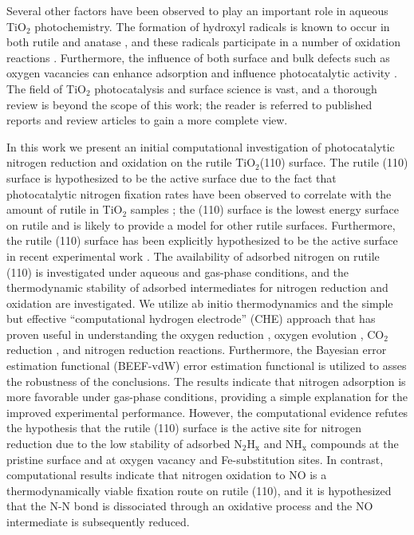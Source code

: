 \documentclass[journal=ascecg,manuscript=article,articletitle=true]{achemso}
\begin{document}
Several other factors have been observed to play an important role in aqueous TiO$_2$ photochemistry. The formation of hydroxyl radicals is known to occur in both rutile and anatase \cite{Ishibashi_2000,Xiang_2011}, and these radicals participate in a number of oxidation reactions \cite{Ishibashi_2000}. Furthermore, the influence of both surface and bulk defects such as oxygen vacancies can enhance adsorption and influence photocatalytic activity \cite{Yan_2013}.
The field of TiO$_2$ photocatalysis and surface science is vast, and a thorough review is beyond the scope of this work; the reader is referred to published reports and review articles to gain a more complete view. \cite{Henderson_2011,Diebold2003,Benkoula2015,Pang2008,Pang_2013}

In this work we present an initial computational investigation of photocatalytic nitrogen reduction and oxidation on the rutile TiO$_2$(110) surface. The rutile (110) surface is hypothesized to be the active surface due to the fact that photocatalytic nitrogen fixation rates have been observed to correlate with the amount of rutile in TiO$_2$ samples \cite{Schrauzer_2011}; the (110) surface is the lowest energy surface on rutile and is likely to provide a model for other rutile surfaces. Furthermore, the rutile (110) surface has been explicitly hypothesized to be the active surface in recent experimental work \cite{Hirakawa_2017}. The availability of adsorbed nitrogen on rutile (110) is investigated under aqueous and gas-phase conditions, and the thermodynamic stability of adsorbed intermediates for nitrogen reduction and oxidation are investigated. We utilize ab initio thermodynamics \cite{Reuter_2001,Reuter_2005} and the simple but effective ``computational hydrogen electrode'' (CHE) approach \cite{Calle_Vallejo_2012} that has proven useful in understanding the oxygen reduction \cite{Norskov_2004}, oxygen evolution \cite{Man_2011}, CO$_2$ reduction \cite{Peterson_2010}, and nitrogen reduction \cite{Skulason_2012} reactions. Furthermore, the Bayesian error estimation functional (BEEF-vdW) error estimation functional \cite{Wellendorff_2012} is utilized to asses the robustness of the conclusions. The results indicate that nitrogen adsorption is more favorable under gas-phase conditions, providing a simple explanation for the improved experimental performance. However, the computational evidence refutes the hypothesis that the rutile (110) surface is the active site for nitrogen reduction due to the low stability of adsorbed N$_2$H$_{\mathrm{x}}$ and NH$_{\mathrm{x}}$ compounds at the pristine surface and at oxygen vacancy and Fe-substitution sites. In contrast, computational results indicate that nitrogen oxidation to NO is a thermodynamically viable fixation route on rutile (110), and it is hypothesized that the N-N bond is dissociated through an oxidative process and the NO intermediate is subsequently reduced.
\end{document}
